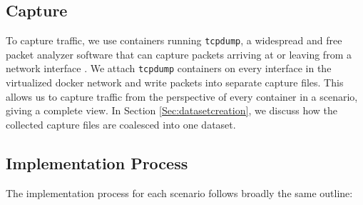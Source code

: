 \subsection{Capture}


To capture traffic, we use containers running \texttt{tcpdump}, a widespread and free packet analyzer software that can capture packets arriving at or leaving from a network interface \cite{jacobson1989tcpdump}.
We attach \texttt{tcpdump} containers on every interface in the virtualized docker network and write packets into separate capture files. This allows us to capture traffic from the perspective of every container in a scenario, giving a complete view. %
In Section \ref{Sec:datasetcreation}, we discuss how the collected capture files are coalesced into one dataset.


\subsection{Implementation Process}

The implementation process for each scenario follows broadly the same outline: 

